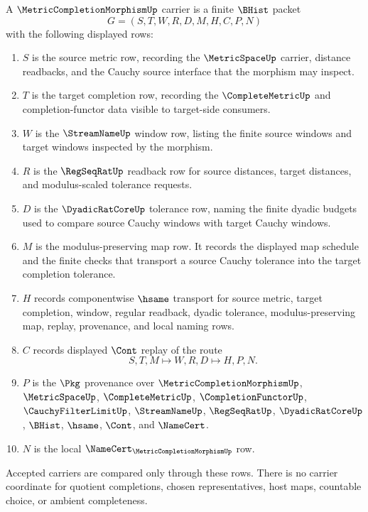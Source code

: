 \begin{definition}
\label{def:metric-completion-morphism-carrier}
A $\MetricCompletionMorphismUp$ carrier is a finite $\BHist$ packet
$$
G=(S,T,W,R,D,M,H,C,P,N)
$$
with the following displayed rows:
\begin{enumerate}
\item $S$ is the source metric row, recording the $\MetricSpaceUp$ carrier, distance readbacks, and the Cauchy source interface that the morphism may inspect.
\item $T$ is the target completion row, recording the $\CompleteMetricUp$ and completion-functor data visible to target-side consumers.
\item $W$ is the $\StreamNameUp$ window row, listing the finite source windows and target windows inspected by the morphism.
\item $R$ is the $\RegSeqRatUp$ readback row for source distances, target distances, and modulus-scaled tolerance requests.
\item $D$ is the $\DyadicRatCoreUp$ tolerance row, naming the finite dyadic budgets used to compare source Cauchy windows with target Cauchy windows.
\item $M$ is the modulus-preserving map row. It records the displayed map schedule and the finite checks that transport a source Cauchy tolerance into the target completion tolerance.
\item $H$ records componentwise $\hsame$ transport for source metric, target completion, window, regular readback, dyadic tolerance, modulus-preserving map, replay, provenance, and local naming rows.
\item $C$ records displayed $\Cont$ replay of the route
$$
S,T,M \longmapsto W,R,D \longmapsto H,P,N .
$$
\item $P$ is the $\Pkg$ provenance over $\MetricCompletionMorphismUp$, $\MetricSpaceUp$, $\CompleteMetricUp$, $\CompletionFunctorUp$, $\CauchyFilterLimitUp$, $\StreamNameUp$, $\RegSeqRatUp$, $\DyadicRatCoreUp$, $\BHist$, $\hsame$, $\Cont$, and $\NameCert$.
\item $N$ is the local $\NameCert_{\MetricCompletionMorphismUp}$ row.
\end{enumerate}
Accepted carriers are compared only through these rows. There is no carrier coordinate for quotient completions, chosen representatives, host maps, countable choice, or ambient completeness.
\end{definition}

